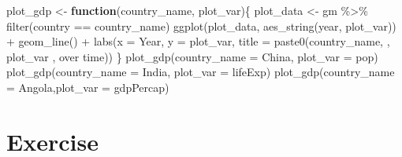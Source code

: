 \documentclass[
]{book}
\newenvironment{Shaded}{\begin{snugshade}}{\end{snugshade}}
\newcommand{\AttributeTok}[1]{\textcolor[rgb]{0.77,0.63,0.00}{#1}}
\newcommand{\ControlFlowTok}[1]{\textcolor[rgb]{0.13,0.29,0.53}{\textbf{#1}}}
\newcommand{\FunctionTok}[1]{\textcolor[rgb]{0.00,0.00,0.00}{#1}}
\newcommand{\NormalTok}[1]{#1}
\newcommand{\OtherTok}[1]{\textcolor[rgb]{0.56,0.35,0.01}{#1}}
\newcommand{\SpecialCharTok}[1]{\textcolor[rgb]{0.00,0.00,0.00}{#1}}
\newcommand{\StringTok}[1]{\textcolor[rgb]{0.31,0.60,0.02}{#1}}
\begin{document}
\begin{Shaded}
\begin{Highlighting}[]
\NormalTok{plot\_gdp }\OtherTok{\textless{}{-}} \ControlFlowTok{function}\NormalTok{(country\_name, plot\_var)\{}
\NormalTok{  plot\_data }\OtherTok{\textless{}{-}}\NormalTok{ gm }\SpecialCharTok{\%\textgreater{}\%} \FunctionTok{filter}\NormalTok{(country }\SpecialCharTok{==}\NormalTok{ country\_name) }
  \FunctionTok{ggplot}\NormalTok{(plot\_data, }\FunctionTok{aes\_string}\NormalTok{(}\StringTok{\textquotesingle{}year\textquotesingle{}}\NormalTok{, plot\_var)) }\SpecialCharTok{+} 
    \FunctionTok{geom\_line}\NormalTok{() }\SpecialCharTok{+}
    \FunctionTok{labs}\NormalTok{(}\AttributeTok{x =} \StringTok{\textquotesingle{}Year\textquotesingle{}}\NormalTok{, }\AttributeTok{y =}\NormalTok{ plot\_var, }\AttributeTok{title =} \FunctionTok{paste0}\NormalTok{(country\_name,}\StringTok{\textquotesingle{} \textquotesingle{}}\NormalTok{, plot\_var ,}\StringTok{\textquotesingle{} over time\textquotesingle{}}\NormalTok{))}
\NormalTok{\}}
\FunctionTok{plot\_gdp}\NormalTok{(}\AttributeTok{country\_name =} \StringTok{\textquotesingle{}China\textquotesingle{}}\NormalTok{, }\AttributeTok{plot\_var =} \StringTok{\textquotesingle{}pop\textquotesingle{}}\NormalTok{)}
\FunctionTok{plot\_gdp}\NormalTok{(}\AttributeTok{country\_name =} \StringTok{\textquotesingle{}India\textquotesingle{}}\NormalTok{, }\AttributeTok{plot\_var =} \StringTok{\textquotesingle{}lifeExp\textquotesingle{}}\NormalTok{)}
\FunctionTok{plot\_gdp}\NormalTok{(}\AttributeTok{country\_name =} \StringTok{\textquotesingle{}Angola\textquotesingle{}}\NormalTok{,}\AttributeTok{plot\_var =} \StringTok{\textquotesingle{}gdpPercap\textquotesingle{}}\NormalTok{)}
\end{Highlighting}
\end{Shaded}

\hypertarget{exercise}{%
\section*{Exercise}\label{exercise}}
\end{document}
